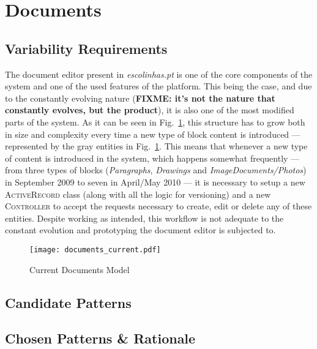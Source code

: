 \section{Documents}\label{sec:fa_documents}

\subsection{Variability Requirements}\label{sec:fa_documents_variability_requirements}

The document editor present in \emph{escolinhas.pt} is one of the core components of the system and one of the used features of the platform. This being the case, and due to the constantly evolving nature (\textbf{FIXME: it's not the nature that constantly evolves, but the product}), it is also one of the most modified parts of the system. As it can be seen in Fig.~\ref{fig:documents_current}, this structure has to grow both in size and complexity every time a new type of block content is introduced --- represented by the gray entities in Fig.~\ref{fig:documents_current}. This means that whenever a new type of content is introduced in the system, which happens somewhat frequently --- from three types of blocks (\emph{Paragraphs}, \emph{Drawings} and \emph{ImageDocuments/Photos}) in September 2009 to seven in April/May 2010 --- it is necessary to setup a new \textsc{ActiveRecord} class (along with all the logic for versioning) and a new \textsc{Controller} to accept the requests necessary to create, edit or delete any of these entities. Despite working as intended, this workflow is not adequate to the constant evolution and prototyping the document editor is subjected to.

\begin{figure}[H]
  \centering
  \texttt{[image: documents\_current.pdf]}
  \caption{Current Documents Model}
  \label{fig:documents_current}
\end{figure}

\subsection{Candidate Patterns}\label{sec:fa_documents_candidate_patterns}

\subsection{Chosen Patterns \& Rationale}\label{sec:fa_documents_chosen_patterns_rationale}

